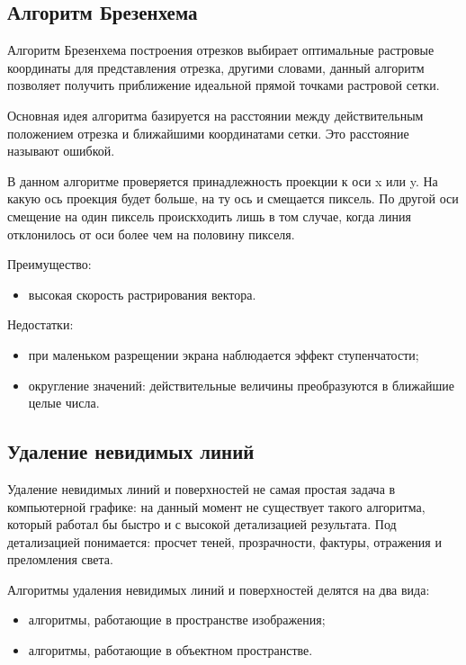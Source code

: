 \subsection{Алгоритм Брезенхема}
\hspace{0.6cm}Алгоритм Брезенхема построения отрезков выбирает оптимальные растровые координаты для представления отрезка, другими словами, данный алгоритм позволяет получить приближение идеальной прямой точками растровой сетки.

\vspace{0.3cm}Основная идея алгоритма базируется на расстоянии между действительным положением отрезка и ближайшими координатами сетки. Это расстояние называют ошибкой\cite{book:rojers}.

\vspace{0.3cm}В данном алгоритме проверяется принадлежность проекции к оси x или y. На какую ось проекция будет больше, на ту ось и смещается пиксель. По другой оси смещение на один пиксель проискходить лишь в том случае, когда линия отклонилось от оси более чем на половину пикселя.

\vspace{0.3cm}Преимущество:
\begin{itemize}
	\item высокая скорость растрирования вектора.
\end{itemize}

\vspace{0.3cm}Недостатки:
\begin{itemize}
	\item при маленьком разрещении экрана наблюдается эффект ступенчатости;
	\item округление значений: действительные величины преобразуются в ближайшие целые числа. 
\end{itemize}

\subsection{Удаление невидимых линий}
\hspace{0.6cm}Удаление невидимых линий и поверхностей не самая простая задача в компьютерной графике: на данный момент не существует такого алгоритма, который работал бы быстро и с высокой детализацией результата. Под детализацией понимается: просчет теней, прозрачности, фактуры, отражения и преломления света.

\vspace{0.3cm}Алгоритмы удаления невидимых линий и поверхностей делятся на два вида:
\begin{itemize}
	\item алгоритмы, работающие в пространстве изображения;
	\item алгоритмы, работающие в объектном пространстве.
\end{itemize}


